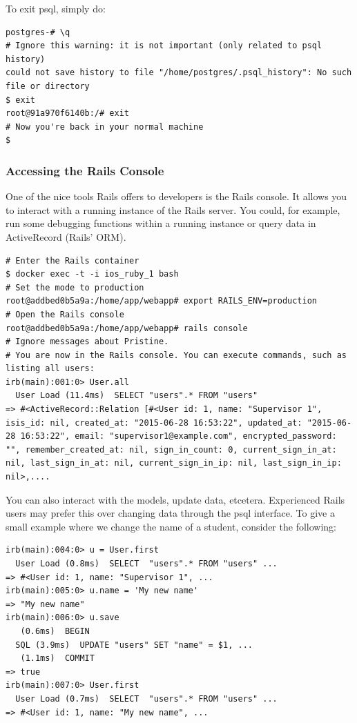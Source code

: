 To exit psql, simply do:
\begin{verbatim}
postgres-# \q
# Ignore this warning: it is not important (only related to psql history)
could not save history to file "/home/postgres/.psql_history": No such file or directory
$ exit
root@91a970f6140b:/# exit
# Now you're back in your normal machine
$ 
\end{verbatim}

\subsubsection{Accessing the Rails Console}
One of the nice tools Rails offers to developers is the Rails console. It allows you to interact with a running instance of the Rails server. You could, for example, run some debugging functions within a running instance or query data in ActiveRecord (Rails' ORM).

\begin{verbatim}
# Enter the Rails container
$ docker exec -t -i ios_ruby_1 bash
# Set the mode to production
root@addbed0b5a9a:/home/app/webapp# export RAILS_ENV=production
# Open the Rails console
root@addbed0b5a9a:/home/app/webapp# rails console
# Ignore messages about Pristine.
# You are now in the Rails console. You can execute commands, such as listing all users:
irb(main):001:0> User.all
  User Load (11.4ms)  SELECT "users".* FROM "users"
=> #<ActiveRecord::Relation [#<User id: 1, name: "Supervisor 1", isis_id: nil, created_at: "2015-06-28 16:53:22", updated_at: "2015-06-28 16:53:22", email: "supervisor1@example.com", encrypted_password: "", remember_created_at: nil, sign_in_count: 0, current_sign_in_at: nil, last_sign_in_at: nil, current_sign_in_ip: nil, last_sign_in_ip: nil>,....
\end{verbatim}

You can also interact with the models, update data, etcetera. Experienced Rails users may prefer this over changing data through the psql interface. To give a small example where we change the name of a student, consider the following:

\begin{verbatim}
irb(main):004:0> u = User.first
  User Load (0.8ms)  SELECT  "users".* FROM "users" ...
=> #<User id: 1, name: "Supervisor 1", ...
irb(main):005:0> u.name = 'My new name'
=> "My new name"
irb(main):006:0> u.save
   (0.6ms)  BEGIN
  SQL (3.9ms)  UPDATE "users" SET "name" = $1, ...
   (1.1ms)  COMMIT
=> true
irb(main):007:0> User.first
  User Load (0.7ms)  SELECT  "users".* FROM "users" ...
=> #<User id: 1, name: "My new name", ...
\end{verbatim}


